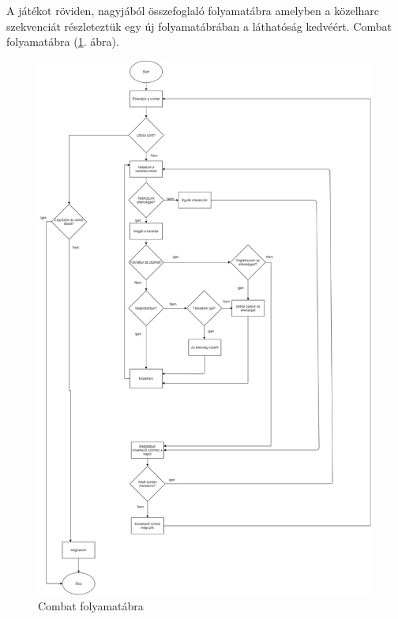 
A játékot röviden, nagyjából összefoglaló folyamatábra amelyben a közelharc szekvenciát részleteztük egy új folyamatábrában a láthatóság kedvéért. Combat folyamatábra (\ref{fig:combat}. ábra).

\begin{figure}[h]
	\centering
	\includegraphics[width=\textwidth]{images/image1.png}
	\caption{Combat folyamatábra}
	\label{fig:combat}
\end{figure}


